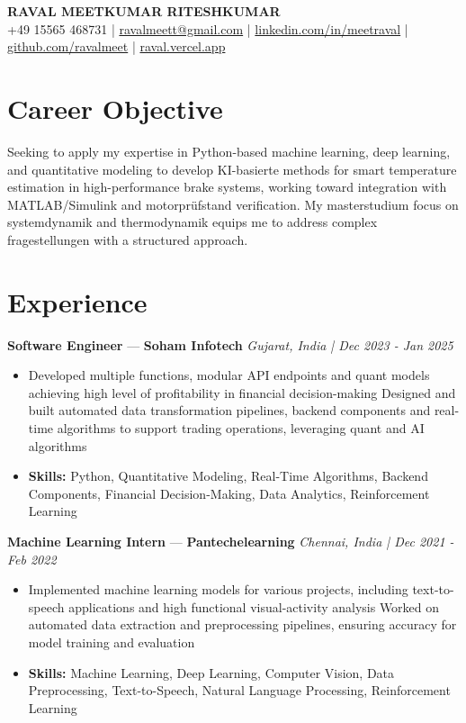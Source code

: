 \documentclass[a4paper,10pt]{article}
\begin{document}
\begin{center}
  {\Large\bfseries RAVAL MEETKUMAR RITESHKUMAR}\\[2pt]
  {\small +49 15565 468731 \;|\; \href{mailto:ravalmeett@gmail.com}{ravalmeett@gmail.com} \;|\; \href{https://www.linkedin.com/in/meetraval/}{linkedin.com/in/meetraval} \;|\; \href{https://github.com/ravalmeet}{github.com/ravalmeet} \;|\; \href{https://raval.vercel.app/}{raval.vercel.app}}
\end{center}
\vspace{-3pt}

\section*{Career Objective}
Seeking to apply my expertise in Python-based machine learning, deep learning, and quantitative modeling to develop KI-basierte methods for smart temperature estimation in high-performance brake systems, working toward integration with MATLAB/Simulink and motorprüfstand verification. My masterstudium focus on systemdynamik and thermodynamik equips me to address complex fragestellungen with a structured approach.\par

\section*{Experience}
\textbf{Software Engineer} — \textbf{Soham Infotech} \hfill \textit{Gujarat, India \;|\; Dec 2023 - Jan 2025}\par
\vspace{1pt}
\begin{itemize}
  \item Developed multiple functions, modular API endpoints and quant models achieving high level of profitability in financial decision-making Designed and built automated data transformation pipelines, backend components and real-time algorithms to support trading operations, leveraging quant and AI algorithms
  \item \textbf{Skills:} Python, Quantitative Modeling, Real-Time Algorithms, Backend Components, Financial Decision-Making, Data Analytics, Reinforcement Learning
\end{itemize}
\vspace{3pt}
\textbf{Machine Learning Intern} — \textbf{Pantechelearning} \hfill \textit{Chennai, India \;|\; Dec 2021 - Feb 2022}\par
\vspace{1pt}
\begin{itemize}
  \item Implemented machine learning models for various projects, including text-to-speech applications and high functional visual-activity analysis Worked on automated data extraction and preprocessing pipelines, ensuring accuracy for model training and evaluation
  \item \textbf{Skills:} Machine Learning, Deep Learning, Computer Vision, Data Preprocessing, Text-to-Speech, Natural Language Processing, Reinforcement Learning
\end{itemize}
\end{document}
